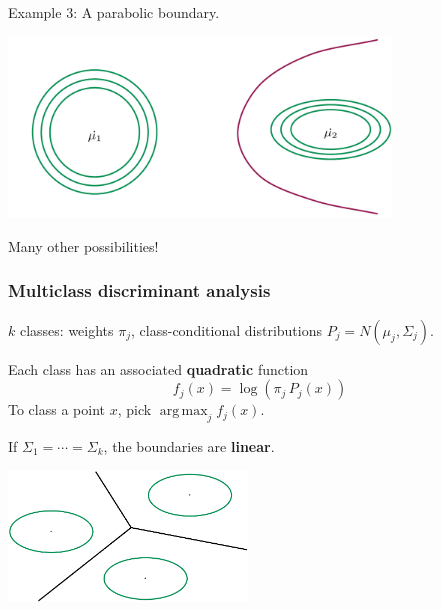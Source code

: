 \documentclass[smaller]{beamer}
\def\darkred{\color{red!70!black}}
\DeclareMathOperator*{\argmax}{arg\,max}
\def\v2{{\vskip.2in}}
\begin{document}
%

\begin{frame}

{\darkred Example 3: A parabolic boundary.}

\begin{center}
\includegraphics[width=4in]{discriminant9.pdf}
\end{center}

\pause\alert{Many other possibilities!}

\end{frame}

\begin{frame}
\frametitle{Multiclass discriminant analysis}

{\darkred $k$ classes: weights $\pi_j$, class-conditional distributions $P_j = N(\mu_j, \Sigma_j)$.}

\pause\v2
Each class has an associated {\bf quadratic} function
$$ f_j(x) = \log \left( \pi_j \, P_j(x) \right) $$ 
To class a point $x$, pick $\argmax_j f_j(x)$.

\pause\v2
\alert{If $\Sigma_1 = \cdots = \Sigma_k$, the boundaries are {\bf linear}.}

\begin{center}
\includegraphics[width=2.5in]{discriminant10.pdf}
\end{center}

\end{frame}
\end{document}
